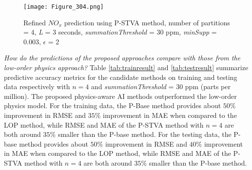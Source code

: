 \documentclass[letterpaper]{article} %
\begin{document}
\begin{figure}
    \centering
    \texttt{[image:  Figure\_304.png]}
    \caption{Refined $NO_{x}$ prediction using P-STVA method, number of partitions = 4, \textit{L} = 3 seconds, \textit{summationThreshold} = 30 ppm, \textit{minSupp} = 0.003, $\epsilon$ = 2}
    \label{fig:refined}
\end{figure}


\textit{How do the predictions of the proposed approaches compare with those from the low-order physics approach?} Table \ref{tab:trainresult} and \ref{tab:testresult} summarize predictive accuracy metrics for the candidate methods on training and testing data respectively with $n=4$ and \textit{summationThreshold} = 30 ppm (parts per million). The proposed physics-aware AI methods outperformed the low-order physics model. For the training data, the P-Base method provides about $50\%$ improvement in RMSE and $35\%$ improvement in MAE when compared to the LOP method, while RMSE and MAE of the P-STVA method with $n=4$ are both around $35\%$ smaller than the P-base method. For the testing data, the P-base method provides about $50\%$ improvement in RMSE and $40\%$ improvement in MAE when compared to the LOP method, while RMSE and MAE of the P-STVA method with $n=4$ are both around $35\%$ smaller than the P-base method. 
\end{document}
